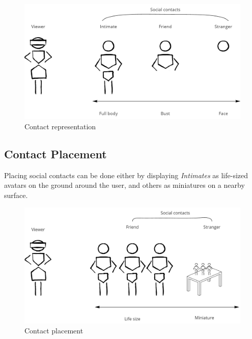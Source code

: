 \begin{figure}[h]
    \centering
    \includegraphics[width=0.8\linewidth]{images/Continuum-representation.jpg}
    \caption{Contact representation}
    \label{fig:continuum:contact-representations}
\end{figure}


\subsection{Contact Placement}

Placing social contacts can be done either by displaying \textit{Intimates} as life-sized avatars on the ground around the user, and others as miniatures on a nearby surface. 

\begin{figure}[h]
    \centering
    \includegraphics[width=0.8\linewidth]{images/Continuum-placement.jpg}
    \caption{Contact placement}
    \label{fig:continuum:contact-placement}
\end{figure}

